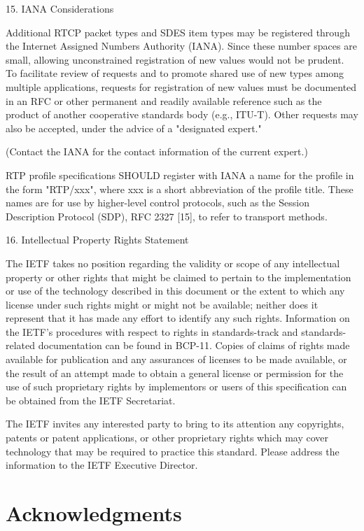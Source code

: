 \documentclass{article}
\begin{document}
15. IANA Considerations

Additional RTCP packet types and SDES item types may be registered through the Internet Assigned Numbers Authority (IANA).  Since these number spaces are small, allowing unconstrained registration of new values would not be prudent.  To facilitate review of requests and to promote shared use of new types among multiple applications, requests for registration of new values must be documented in an RFC or other permanent and readily available reference such as the product of another cooperative standards body (e.g., ITU-T).  Other requests may also be accepted, under the advice of a "designated expert."

(Contact the IANA for the contact information of the current expert.)

RTP profile specifications SHOULD register with IANA a name for the profile in the form "RTP/xxx", where xxx is a short abbreviation of the profile title.  These names are for use by higher-level control protocols, such as the Session Description Protocol (SDP), RFC 2327 [15], to refer to transport methods.

16. Intellectual Property Rights Statement

The IETF takes no position regarding the validity or scope of any intellectual property or other rights that might be claimed to pertain to the implementation or use of the technology described in this document or the extent to which any license under such rights might or might not be available; neither does it represent that it has made any effort to identify any such rights.  Information on the IETF's procedures with respect to rights in standards-track and standards-related documentation can be found in BCP-11.  Copies of claims of rights made available for publication and any assurances of licenses to be made available, or the result of an attempt made to obtain a general license or permission for the use of such proprietary rights by implementors or users of this specification can be obtained from the IETF Secretariat.

The IETF invites any interested party to bring to its attention any copyrights, patents or patent applications, or other proprietary rights which may cover technology that may be required to practice this standard.  Please address the information to the IETF Executive Director.

\section{Acknowledgments}
\end{document}
